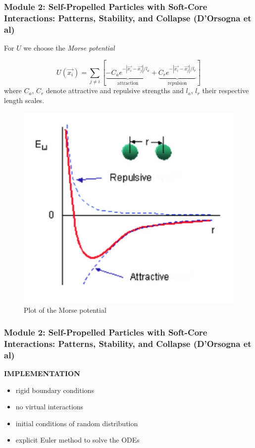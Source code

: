 \documentclass[compress]{beamer}
\begin{document}
\begin{frame}
  \frametitle{Module 2: Self-Propelled Particles with Soft-Core Interactions: Patterns, Stability, and Collapse (D'Orsogna et al)}
	

For \( U \) we choose the \textit{Morse potential} %

\begin{equation} \label{morsePotential}
U(\vec{x_{i}}) = \sum_{j \neq i}^{} [ \underbrace{-C_{a} e^{-| \vec{x_{i}} - \vec{x_{j}} | / l_{a}}}_{\text{attraction}} + \underbrace{C_{r}e^{-|\vec{x_{i}}-\vec{x_{j}}|/l_{r}}}_{\text{repulsion}} ]
\end{equation}
where \( C_{a}\), \( C_{r}\) denote attractive and repulsive strengths and \( l_{a}\), \( l_{r}\) their respective length scales.


\begin{figure}
\includegraphics[width=.35\columnwidth]{./img/Morsepotential.jpg}
\caption{Plot of the Morse potential}
\label{morsepotential}
\end{figure}

\end{frame}


\begin{frame}
  \frametitle{Module 2: Self-Propelled Particles with Soft-Core Interactions: Patterns, Stability, and Collapse (D'Orsogna et al)}
	
	\textbf{IMPLEMENTATION}
	
	\begin{itemize}
		\item rigid boundary conditions
		\item no virtual interactions
		\item initial conditions of random distribution
		\item explicit Euler method to solve the ODEs
	\end{itemize}
	

\end{frame}
\end{document}
